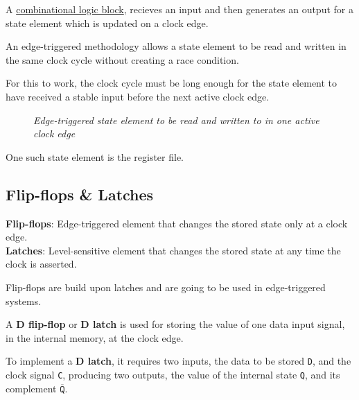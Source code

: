 \documentclass[11pt]{article}
\begin{document}
A \hyperref[box:logic-types]{combinational logic block}, recieves an input and then generates an output for a state element which is updated on a clock edge.

An edge-triggered methodology allows a state element to be read and written in the same clock cycle without creating a race condition.

For this to work, the clock cycle must be long enough for the state element to have received a stable input before the next active clock edge.

\begin{figure}[htbp]
    \centering
    \caption{\textit{Edge-triggered state element to be read and written to in one active clock edge}}
\end{figure}

One such state element is the register file.

\subsection*{Flip-flops \& Latches}

\begin{tcolorbox}[
    enhanced,
    attach boxed title to top left={xshift=6mm,yshift=-1.5mm},
    colback=moonstoneblue!20,
    colframe=moonstoneblue,
    colbacktitle=moonstoneblue,
    title=Types of clocked memory elements,
    fonttitle=\bfseries\color{white},
    boxed title style={size=small,colframe=moonstoneblue,sharp corners},
    sharp corners,
]
    {\color{moondark}\textbf{Flip-flops}}: Edge-triggered element that changes the stored state only at a clock edge. \\
    {\color{moondark}\textbf{Latches}}: Level-sensitive element that changes the stored state at any time the clock is asserted.
\end{tcolorbox}

Flip-flops are build upon latches and are going to be used in edge-triggered systems.

A \textbf{D flip-flop} or \textbf{D latch} is used for storing the value of one data input signal, in the internal memory, at the clock edge.

To implement a \textbf{D latch}, it requires two inputs, the data to be stored \texttt{D}, and the clock signal \texttt{C}, producing two outputs, the value of the internal state \texttt{Q}, and its complement \(\overline{\mathtt{Q}}\).
\end{document}
